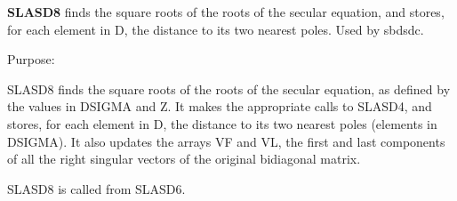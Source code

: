 {\bfseries S\+L\+A\+S\+D8} finds the square roots of the roots of the secular equation, and stores, for each element in D, the distance to its two nearest poles. Used by sbdsdc. 

 \begin{DoxyParagraph}{Purpose\+: }
\begin{DoxyVerb} SLASD8 finds the square roots of the roots of the secular equation,
 as defined by the values in DSIGMA and Z. It makes the appropriate
 calls to SLASD4, and stores, for each  element in D, the distance
 to its two nearest poles (elements in DSIGMA). It also updates
 the arrays VF and VL, the first and last components of all the
 right singular vectors of the original bidiagonal matrix.

 SLASD8 is called from SLASD6.\end{DoxyVerb}
 
\end{DoxyParagraph}

